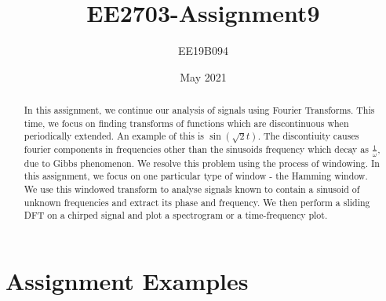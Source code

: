 \documentclass[11pt, a4paper]{article}
\title{EE2703-Assignment9}
\author{EE19B094}
\date{May 2021}
\begin{document}
\maketitle
\newpage
\begin{abstract}

    In this assignment, we continue our analysis of signals using Fourier
    Transforms. This time, we focus on finding transforms of functions which
    are discontinuous when periodically extended. An example of this is
    \(\sin(\sqrt{2} t)\). The discontiuity causes fourier components in
    frequencies other than the sinusoids frequency which decay as
    \(\frac{1}{\omega}\), due to Gibbs phenomenon. We resolve this problem
    using the process of windowing. In this assignment, we focus on one
    particular type of window - the Hamming window. We use this windowed
    transform to analyse signals known to contain a sinusoid of unknown
    frequencies and extract its phase and frequency. We then perform a
    sliding DFT on a chirped signal and plot a spectrogram or a
    time-frequency plot.    

\end{abstract}

\section{Assignment Examples}
\end{document}
